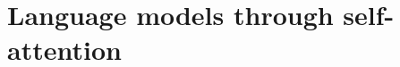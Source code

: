 \setcounter{tocdepth}{1}
\chapter{Language models through self-attention}
\label{ch:foundation}





\setcounter{tocdepth}{2}
